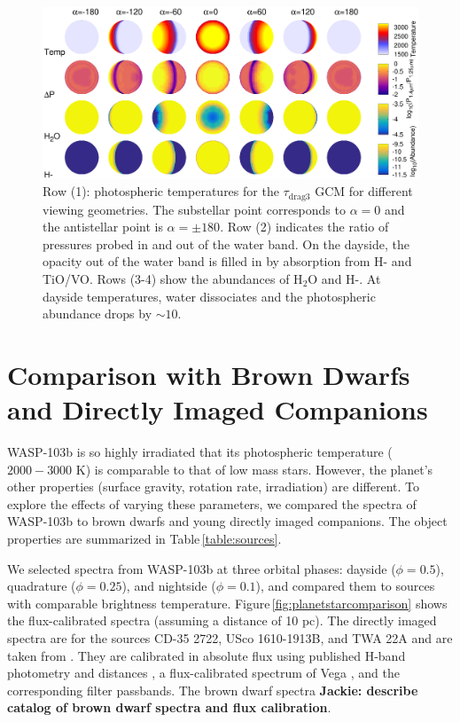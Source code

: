 \documentclass[twocolumn]{aastex61}
\begin{document}
\begin{figure}
	\includegraphics[width = 1.0\textwidth]{Figures/GCM_abundances.eps}
	\caption{Row (1): photospheric temperatures for the $\tau_\mathrm{drag3}$ GCM for different viewing geometries.  The substellar point corresponds to $\alpha = 0$ and the antistellar point is $\alpha = \pm 180$.  Row (2) indicates the ratio of pressures probed in and out of the water band. On the dayside, the opacity out of the water band is filled in by absorption from H- and TiO/VO. Rows (3-4) show the abundances of H$_2$O and H-. At dayside temperatures, water dissociates and the photospheric abundance drops by $\sim10$.  }
\label{fig:GCMabundance}
\end{figure}

\section{Comparison with Brown Dwarfs and Directly Imaged Companions}
\label{sec:comparison}
WASP-103b is so highly irradiated that its photospheric temperature ($2000 - 3000$ K) is comparable to that of low mass stars. However, the planet's other properties (surface gravity, rotation rate, irradiation) are different. To explore the effects of varying these parameters, we compared the spectra of WASP-103b to brown dwarfs and young directly imaged companions. The object properties are summarized in Table\,\ref{table:sources}.  

We selected spectra from WASP-103b at three orbital phases: dayside ($\phi = 0.5$), quadrature ($\phi = 0.25$), and nightside ($\phi = 0.1$), and compared them to sources with comparable brightness temperature. Figure\,\ref{fig:planetstarcomparison} shows the flux-calibrated spectra (assuming a distance of 10 pc).  The directly imaged spectra are for the sources CD-35 2722, USco 1610-1913B, and TWA 22A and are taken from \cite{wahhaj11, aller13, bonnefoy14}. They are calibrated in absolute flux using published H-band photometry \citep{wahhaj11, aller13, bonnefoy09} and distances \citep{gaia16, teixeira09}, a flux-calibrated spectrum of Vega \citep{1985A&A...151..399M, 1985IAUS..111..225H}, and the corresponding filter passbands.  The brown dwarf spectra \textbf{Jackie: describe catalog of brown dwarf spectra and flux calibration}.
\end{document}
